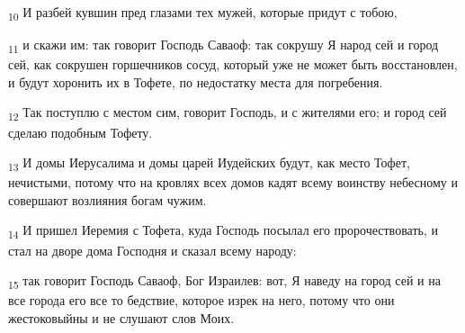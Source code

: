 \begin{tcolorbox}
\textsubscript{10} И разбей кувшин пред глазами тех мужей, которые придут с тобою,
\end{tcolorbox}
\begin{tcolorbox}
\textsubscript{11} и скажи им: так говорит Господь Саваоф: так сокрушу Я народ сей и город сей, как сокрушен горшечников сосуд, который уже не может быть восстановлен, и будут хоронить их в Тофете, по недостатку места для погребения.
\end{tcolorbox}
\begin{tcolorbox}
\textsubscript{12} Так поступлю с местом сим, говорит Господь, и с жителями его; и город сей сделаю подобным Тофету.
\end{tcolorbox}
\begin{tcolorbox}
\textsubscript{13} И домы Иерусалима и домы царей Иудейских будут, как место Тофет, нечистыми, потому что на кровлях всех домов кадят всему воинству небесному и совершают возлияния богам чужим.
\end{tcolorbox}
\begin{tcolorbox}
\textsubscript{14} И пришел Иеремия с Тофета, куда Господь посылал его пророчествовать, и стал на дворе дома Господня и сказал всему народу:
\end{tcolorbox}
\begin{tcolorbox}
\textsubscript{15} так говорит Господь Саваоф, Бог Израилев: вот, Я наведу на город сей и на все города его все то бедствие, которое изрек на него, потому что они жестоковыйны и не слушают слов Моих.
\end{tcolorbox}
